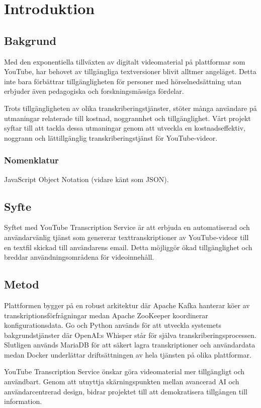 \chapter{Introduktion}

\section{Bakgrund}
Med den exponentiella tillväxten av digitalt videomaterial på plattformar som YouTube, har behovet av tillgängliga textversioner blivit alltmer angeläget. Detta inte bara förbättrar tillgängligheten för personer med hörselnedsättning utan erbjuder även pedagogiska och forskningsmässiga fördelar.

Trots tillgängligheten av olika transkriberingstjänster, stöter många användare på utmaningar relaterade till kostnad, noggrannhet och tillgänglighet. Vårt projekt syftar till att tackla dessa utmaningar genom att utveckla en kostnadseffektiv, noggrann och lättillgänglig transkriberingstjänst för YouTube-videor.

\subsection{Nomenklatur}
JavaScript Object Notation (vidare känt som JSON).

\section{Syfte}
Syftet med YouTube Transcription Service är att erbjuda en automatiserad och användarvänlig tjänst som genererar texttranskriptioner av YouTube-videor till en textfil skickad till användarens email. Detta möjliggör ökad tillgänglighet och breddar användningsområdena för videoinnehåll.

\section{Metod}
Plattformen bygger på en robust arkitektur där Apache Kafka hanterar köer av transkriptionsförfrågningar medan Apache ZooKeeper koordinerar konfigurationsdata. Go och Python används för att utveckla systemets bakgrundstjänster där OpenAI:s Whisper står för själva transkriberingsprocessen. Slutligen används MariaDB för att säkert lagra transkriptioner och användardata medan Docker underlättar driftsättningen av hela tjänsten på olika plattformar.

YouTube Transcription Service önskar göra videomaterial mer tillgängligt och användbart. Genom att utnyttja skärningspunkten mellan avancerad AI och användarcentrerad design, bidrar projektet till att demokratisera tillgången till information.
